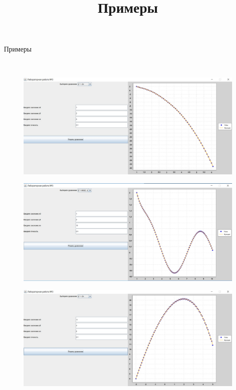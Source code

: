 \title{Примеры}{\begin{center}
    Примеры
\end{center}} \\
\begin{figure}[H]
\includegraphics[width = 1\textwidth]{0.png}
\end{figure} 

\begin{figure}[H]
\includegraphics[width = 1\textwidth]{1.png}
\end{figure} 

\begin{figure}[H]
\includegraphics[width = 1\textwidth]{2.png}
\end{figure} 
